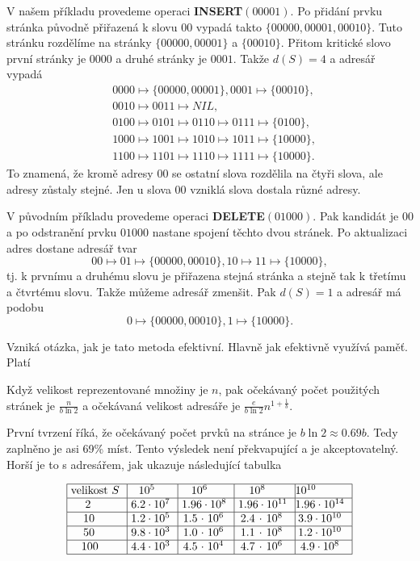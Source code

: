 \documentclass[a4paper,12pt]{article}
\begin{document}
V našem příkladu provedeme operaci 
{\bf INSERT$(00001)$}. Po přidání prvku stránka původně 
přiřazená k slovu $00$ vypadá takto $\{00000,00001,0001
0\}$. Tuto 
stránku rozdělíme na  
strán\-ky $\{00000,00001\}$ a $\{00010\}$. Přitom kritické slovo 
první strán\-ky je $0000$ a druhé strán\-ky je $0001$. Takže 
$d(S)=4$ a adresář vypadá 
\begin{align*}&0000\mapsto \{00000,00001\},0001\mapsto \{00010\},\\
&0010\mapsto 0011\mapsto NIL,\\
&0100\mapsto 0101\mapsto 0110\mapsto 0111\mapsto \{0100\},\\
&1000\mapsto 1001\mapsto 1010\mapsto 1011\mapsto \{10000\},\\
&1100\mapsto 1101\mapsto 1110\mapsto 1111\mapsto \{10000\}.\end{align*}
To znamená, že kromě adresy $00$ se ostatní slova rozdělila 
na čtyři slova, ale adresy zůstaly stejné. Jen u 
slova 00 vzniklá slova dostala různé adresy.

V původním příkladu 
provedeme operaci {\bf DELETE$(01000)$}. Pak kandidát je $00$ a po 
odstranění prvku $01000$ nastane spojení těchto dvou 
stránek. Po aktualizaci adres dostane adresář tvar
$$00\mapsto 01\mapsto \{00000,00010\},10\mapsto 11\mapsto \{10000
\},$$
tj. k prvnímu a druhému slovu je přiřazena stejná 
stránka a stejně tak k třetímu a čtvrtému slovu. Takže 
můžeme adresář zmenšit. Pak $d(S)=1$ a adresář má 
podobu  
$$0\mapsto \{00000,00010\},1\mapsto \{10000\}.$$

Vzniká otázka, jak je tato metoda efektivní. 
Hlavně jak efektivně využívá paměť. Platí

\begin{veta}Když velikost repre\-zentované množiny je $
n$, pak 
očekávaný počet použitých stránek je 
$\frac n{b\ln2}$ a očekáva\-ná velikost adresáře je $\frac 
e{b\ln2}n^{1+\frac 1b}$. 
\end{veta}

První tvrzení říká, že očekávaný počet 
prvků na stránce je $b\ln2\approx 0.69b$. Tedy zaplněno 
je asi 69\% míst. Tento výsledek není překvapující a je 
akceptovatelný. Horší je to s adresářem, jak ukazuje 
následující tabulka

$$\vtop{\offinterlineskip\halign {\strut\vrule\ # & \vrule\ # & \vrule\ # & \vrule\ # & \vrule \hfil # \hfil \vrule\cr\noalign{\hrule}velikost $S$ & $10^5$ & $10^6$ & $10^8$ & $10^{10}$ \hfill \cr\noalign{\hrule} 2 & $6.2\cdot10^7$ & $1.96\cdot10^8$ & $1.96\cdot10^{11}$ & $1.96\cdot10^{14}$ \cr\noalign{\hrule} $10$ & $1.2\cdot10^5$ & $1.5\cdot10^6$ & $2.4\cdot10^8$ & $3.9\cdot10^{10}$ \cr\noalign{\hrule} $50$ & $9.8\cdot10^3$ & $1.0\cdot10^6$ & $1.1\cdot10^8$ & $1.2\cdot10^{10}$ \cr\noalign{\hrule} $100$ & $4.4\cdot10^3$ & $4.5\cdot10^4$ & $4.7\cdot10^6$ & $4.9\cdot10^8$ \cr\noalign{\hrule}}}$$
\end{document}
